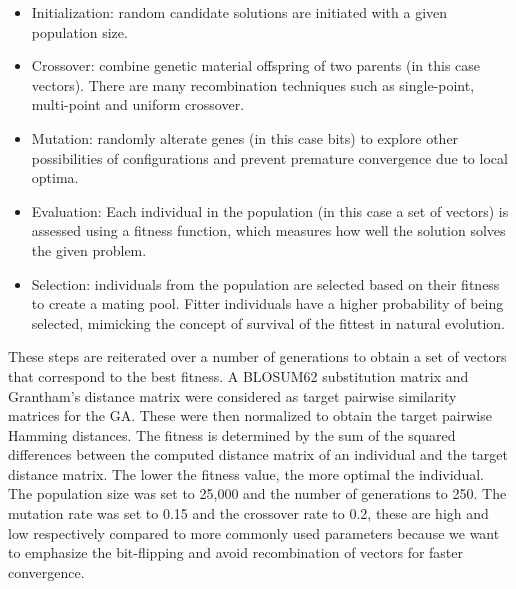 \begin{itemize}
    \item Initialization: random candidate solutions are initiated with a given population size.
    \item Crossover: combine genetic material offspring of two parents (in this case vectors). There are many recombination techniques such as single-point, multi-point and uniform crossover.
    \item Mutation: randomly alterate genes (in this case bits) to explore other possibilities of configurations and prevent premature convergence due to local optima.
    \item Evaluation: Each individual in the population (in this case a set of vectors) is assessed using a fitness function, which measures how well the solution solves the given problem.
    \item Selection: individuals from the population are selected based on their fitness to create a mating pool. Fitter individuals have a higher probability of being selected, mimicking the concept of survival of the fittest in natural evolution.
\end{itemize}
These steps are reiterated over a number of generations to obtain a set of vectors that correspond to the best fitness. A BLOSUM62 substitution matrix \cite{blosum} and Grantham's distance matrix \cite{aa_evolution} were considered as target pairwise similarity matrices for the GA. These were then normalized to obtain the target pairwise Hamming distances. The fitness is determined by the sum of the squared differences between the computed distance matrix of an individual and the target distance matrix. The lower the fitness value, the more optimal the individual. The population size was set to 25,000 and the number of generations to 250. The mutation rate was set to 0.15 and the crossover rate to 0.2, these are high and low respectively compared to more commonly used parameters because we want to emphasize the bit-flipping and avoid recombination of vectors for faster convergence.

